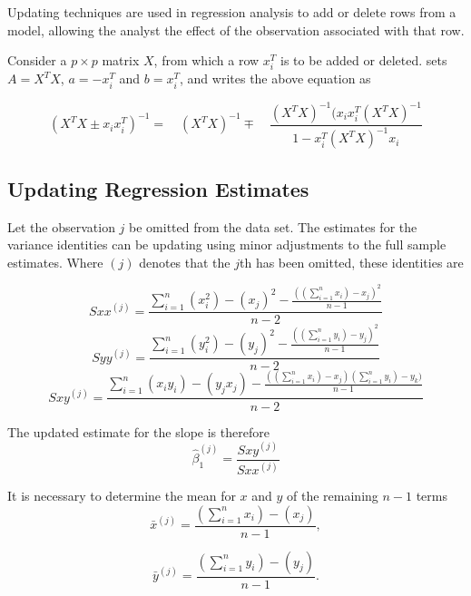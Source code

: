 \documentclass[MAIN.tex]{subfiles}
\begin{document}
Updating techniques are used in regression analysis to add or delete rows from a model, allowing the analyst the effect of the observation associated with that row.

Consider a $p \times p$ matrix $X$, from which a row $x_{i}^{T}$
is to be added or deleted. \citet{CookWeisberg} sets $A = X^{T}X$,
$a=-x_{i}^{T}$ and $b=x_{i}^{T}$, and writes the above equation as

\begin{equation}
(X^{T}X \pm x_{i}x_{i}^{T})^{-1} = \quad(X^{T}X )^{-1} \mp \quad
\frac{(X^{T}X)^{-1}(x_{i}x_{i}^{T}(X^{T}X)^{-1}}{1-x_{i}^{T}(X^{T}X)^{-1}x_{i}}
\end{equation}



\subsection{Updating Regression Estimates}
Let the observation $j$ be omitted from the data set. The estimates for the variance identities can be updating using minor adjustments to the full sample estimates. Where $(j)$ denotes that the $j$th has been omitted, these identities are


\begin{equation}
Sxx^{(j)}=\frac{\sum_{i=1}^{n}(x_{i}^{2})-(x_{j})^{2}-\frac{((\sum_{i=1}^{n}x_{i})-x_{j})^{2}}{n-1}}{n-2}
\end{equation}
\begin{equation}
Syy^{(j)}=\frac{\sum_{i=1}^{n}(y_{i}^{2})-(y_{j})^{2}-\frac{((\sum_{i=1}^{n}y_{i})-y_{j})^{2}}{n-1}}{n-2}
\end{equation}
\begin{equation}
Sxy^{(j)}=\frac{\sum_{i=1}^{n}(x_{i}y_{i})-(y_{j}x_{j})-\frac{((\sum_{i=1}^{n}x_{i})-x_{j})(\sum_{i=1}^{n}y_{i})-y_{k})}{n-1}}{n-2}
\end{equation}


The updated estimate for the slope is therefore
\begin{equation}
\hat{\beta}_{1}^{(j)}=\frac{Sxy^{(j)}}{Sxx^{(j)}}
\end{equation}


It is necessary to determine the mean for $x$ and $y$ of the
remaining $n-1$ terms
\begin{equation}
\bar{x}^{(j)}=\frac{(\sum_{i=1}^{n}x_{i})-(x_{j})}{n-1},
\end{equation}


\begin{equation}
\bar{y}^{(j)}=\frac{(\sum_{i=1}^{n}y_{i})-(y_{j})}{n-1}.
\end{equation}
\end{document}
